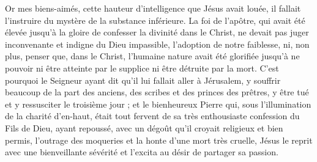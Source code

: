 Or mes biens-aimés, cette hauteur d’intelligence que Jésus avait louée, il fallait l’instruire du mystère de la substance inférieure. La foi de l’apôtre, qui avait été élevée jusqu’à la gloire de confesser la divinité dans le Christ, ne devait pas juger inconvenante et indigne du Dieu impassible, l’adoption de notre faiblesse, ni, non plus, penser que, dans le Christ, l’humaine nature avait été glorifiée jusqu’à ne pouvoir ni être atteinte par le supplice ni être détruite par la mort. C’est pourquoi le Seigneur ayant dit qu’il lui fallait aller à Jérusalem, y souffrir beaucoup de la part des anciens, des scribes et des princes des prêtres, y être tué et y ressusciter le troisième jour ; et le bienheureux Pierre qui, sous l’illumination de la charité d’en-haut, était tout fervent de sa très enthousiaste confession du Fils de Dieu, ayant repoussé, avec un dégoût qu’il croyait religieux et bien permis, l’outrage des moqueries et la honte d’une mort très cruelle, Jésus le reprit avec une bienveillante sévérité et l’excita au désir de partager sa passion.
